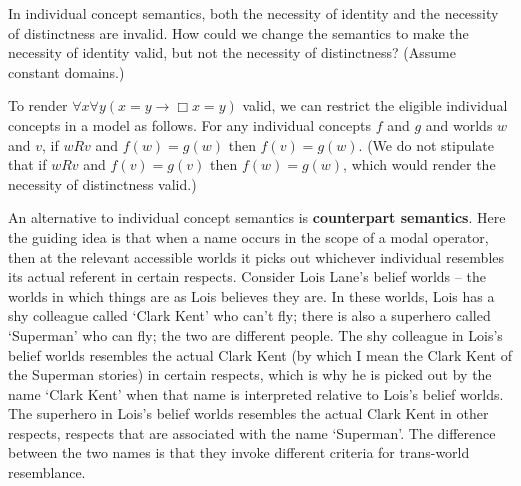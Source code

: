 \begin{exercise}
  In individual concept semantics, both the necessity of identity and the
  necessity of distinctness are invalid. How could we change the semantics to
  make the necessity of identity valid, but not the necessity of distinctness?
  (Assume constant domains.)
\end{exercise}
\begin{solution}
  To render $\forall x \forall y (x\!=\!y \to \Box x\!=\!y)$ valid, we can
  restrict the eligible individual concepts in a model as follows. For any
  individual concepts $f$ and $g$ and worlds $w$ and $v$, if $wRv$ and
  $f(w)=g(w)$ then $f(v)=g(w)$. (We do not stipulate that if $wRv$ and
  $f(v)=g(v)$ then $f(w)=g(w)$, which would render the necessity of distinctness
  valid.)
\end{solution}

\iffalse

An alternative to individual concept semantics is \textbf{counterpart
  semantics}. Here the guiding idea is that when a name occurs in the scope of a
modal operator, then at the relevant accessible worlds it picks out whichever
individual resembles its actual referent in certain respects. Consider Lois
Lane's belief worlds -- the worlds in which things are as Lois believes they
are. In these worlds, Lois has a shy colleague called `Clark Kent' who can't
fly; there is also a superhero called `Superman' who can fly; the two are
different people. The shy colleague in Lois's belief worlds resembles the actual
Clark Kent (by which I mean the Clark Kent of the Superman stories) in certain
respects, which is why he is picked out by the name `Clark Kent' when that name
is interpreted relative to Lois's belief worlds. The superhero in Lois's belief
worlds resembles the actual Clark Kent in other respects, respects that are
associated with the name `Superman'. The difference between the two names is
that they invoke different criteria for trans-world resemblance.


